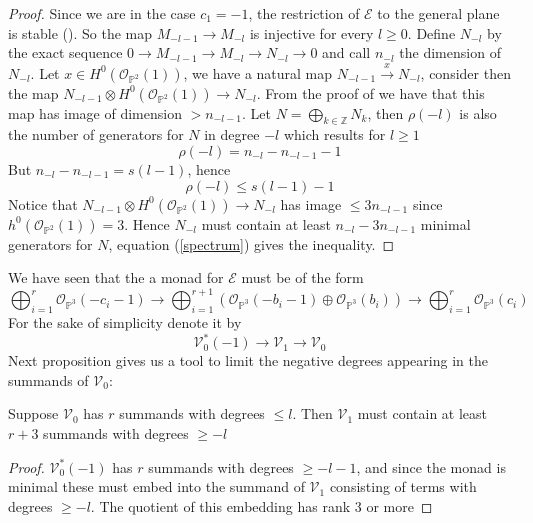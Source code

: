 \documentclass[
	oldfontcommands,
	sumario=abnt-6027-2012,
	12pt,			%
	openright,		%
	oneside,		%
	a4paper,		%
	english,		%
	brazil			%
	]{imecc-unicamp}
\begin{document}
\begin{proof}
Since we are in the case $c_1=-1$, the restriction of $\mathcal{E}$ to the general plane is stable (\cite[Barth, Theorem 3]{Barth1977}). So the map $M_{-l-1} \to M_{-l}$ is injective for every $l \geq 0$. Define $N_{-l}$ by the exact sequence $0 \to M_{-l-1} \to M_{-l} \to N_{-l} \to 0$ and call $n_{-l}$ the dimension of $N_{-l}$. Let $x \in H^0(\mathcal{O}_{\mathbb{P}^2}(1))$, we have a natural map $N_{-l-1} \overset{x}{\to} N_{-l}$, consider then the map $N_{-l-1} \otimes H^0(\mathcal{O}_{\mathbb{P}^2}(1)) {\to} N_{-l}$. From the proof of \cite[Hartshorne, Theorem 5.3]{Hartshorne1980} we have that this map has image of dimension $ > n_{-l-1}$. Let $N=\bigoplus_{k\in \mathbb{Z}}N_k$, then $\rho(-l)$ is also the number of generators for $N$ in degree $-l$ which results for $l \geq 1$
\begin{equation}
\rho(-l)=n_{-l}-n_{-l-1}-1
\end{equation}
But $n_{-l}-n_{-l-1}=s(l-1)$, hence
\begin{equation}
\rho(-l) \leq s(l-1)-1
\end{equation}
Notice that $N_{-l-1} \otimes H^0(\mathcal{O}_{\mathbb{P}^2}(1)) {\to} N_{-l}$ has image $\leq 3n_{-l-1}$ since $h^0(\mathcal{O}_{\mathbb{P}^2}(1))=3$. Hence $N_{-l}$ must contain at least $n_{-l}-3n_{-l-1}$ minimal generators for $N$, equation (\ref{spectrum}) gives the inequality.
\end{proof}
We have seen that the a monad for $\mathcal{E}$ must be of the form
\begin{equation}
\bigoplus_{i=1}^{r} \mathcal{O}_{\mathbb{P}^3}(-c_i-1) \to \bigoplus_{i=1}^{r+1} (\mathcal{O}_{\mathbb{P}^3}(-b_i-1) \oplus \mathcal{O}_{\mathbb{P}^3}(b_i)) \to \bigoplus_{i=1}^{r} \mathcal{O}_{\mathbb{P}^3}(c_i)
\end{equation}
For the sake of simplicity denote it by
\begin{equation}
\mathcal{V}_0^*(-1) \to \mathcal{V}_1 \to \mathcal{V}_0
\end{equation}
Next proposition gives us a tool to limit the negative degrees appearing in the summands of $\mathcal{V}_0$:
\begin{proposition}
Suppose $\mathcal{V}_0$ has $r$ summands with degrees $\leq l$. Then $\mathcal{V}_1$ must contain at least $r+3$ summands with degrees $\geq -l$
\end{proposition}
\begin{proof}
$\mathcal{V}_0^*(-1)$ has $r$ summands with degrees $\geq -l-1$, and since the monad is minimal these must embed into the summand of $\mathcal{V}_1$ consisting of terms with degrees $\geq -l$. The quotient of this embedding has rank 3 or more
\end{proof}
\end{document}
